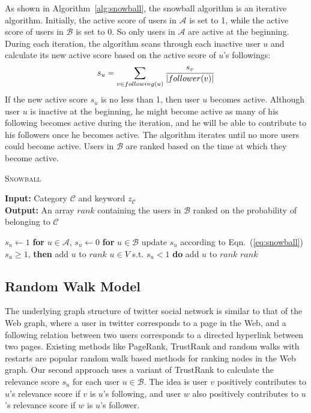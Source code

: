 \documentclass{article}
\begin{document}
As shown in Algorithm~\ref{alg:snowball}, the snowball algorithm is an iterative algorithm. Initially, the active score of users in $\mathcal{A}$ is set to 1, while the active score of users in $\mathcal{B}$ is set to 0. So only users in $\mathcal{A}$ are active at the beginning. During each iteration, the algorithm scans through each inactive user $u$ and calculate its new active score based on the active score of $u$'s followings:
\begin{equation}\label{eq:snowball}
s_u = \sum_{v \in following(u)} \frac{s_v}{|follower(v)|}
\end{equation}
If the new active score $s_u$ is no less than 1, then user $u$ becomes active. Although user $u$ is inactive at the beginning, he might become active as many of his following becomes active during the iteration, and he will be able to contribute to his followers once he becomes active. The algorithm iterates until no more users could become active. Users in $\mathcal{B}$ are ranked based on the time at which they become active.

\begin{algorithm}[htbp]
\caption{\textsc{Snowball}}
\textbf{Input: }{Category $\mathcal{C}$ and keyword $z_{\mathcal{C}}$}\\
\textbf{Output: }{An array $rank$ containing the users in $\mathcal{B}$ ranked on the probability of belonging to $\mathcal{C}$}
\begin{algorithmic}[1]
\STATE $s_u \leftarrow 1$ {\bf for} $u \in \mathcal{A}$, $s_u \leftarrow 0$ {\bf for} $u \in \mathcal{B}$
    \STATE update $s_u$ according to Eqn.~(\ref{eq:snowball})
     $s_u \geq 1$, {\bf then} add $u$ to $rank$
\ENDFOR
\ENDWHILE
{} $u \in V$ s.t. $s_u < 1$ {\bf do} add $u$ to $rank$
\RETURN $rank$
\end{algorithmic}
\label{alg:snowball}
\end{algorithm}

\subsection{Random Walk Model}

The underlying graph structure of twitter social network is similar to that of the Web graph, where a user in twitter corresponds to a page in the Web, and a following relation between two users corresponds to a directed hyperlink between two pages. Existing methods like PageRank\cite{page1999pagerank}, TrustRank\cite{gyngyi2004combating} and random walks with restarts\cite{tong2006fast} are popular random walk based methods for ranking nodes in the Web graph. Our second approach uses a variant of TrustRank to calculate the relevance score $s_u$ for each user $u \in \mathcal{B}$. The idea is user $v$ positively contributes to $u$'s relevance score if $v$ is $u$'s following, and user $w$ also positively contributes to $u$'s relevance score if $w$ is $u$'s follower.
\end{document}
